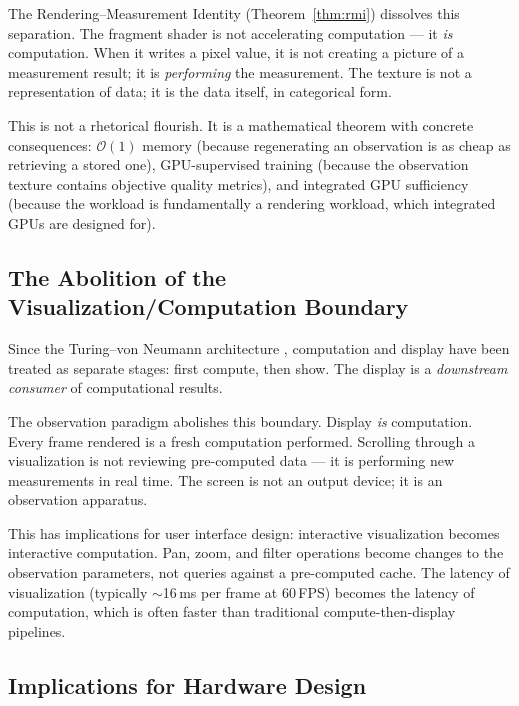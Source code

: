 \documentclass[11pt,twocolumn,a4paper]{article}
\newcommand{\BigO}{\mathcal{O}}
\begin{document}
The Rendering--Measurement Identity (Theorem~\ref{thm:rmi})
dissolves this separation. The fragment shader is not accelerating
computation --- it \emph{is} computation. When it writes a pixel
value, it is not creating a picture of a measurement result; it is
\emph{performing} the measurement. The texture is not a representation
of data; it is the data itself, in categorical form.

This is not a rhetorical flourish. It is a mathematical theorem with
concrete consequences: $\BigO(1)$ memory (because regenerating an
observation is as cheap as retrieving a stored one), GPU-supervised
training (because the observation texture contains objective quality
metrics), and integrated GPU sufficiency (because the workload is
fundamentally a rendering workload, which integrated GPUs are designed
for).

\subsection{The Abolition of the Visualization/Computation Boundary}

Since the Turing--von Neumann architecture \citep{turing1937,
vonneumann1945}, computation and display have been treated as
separate stages: first compute, then show. The display is a
\emph{downstream consumer} of computational results.

The observation paradigm abolishes this boundary. Display \emph{is}
computation. Every frame rendered is a fresh computation performed.
Scrolling through a visualization is not reviewing pre-computed data
--- it is performing new measurements in real time. The screen is not
an output device; it is an observation apparatus.

This has implications for user interface design: interactive
visualization becomes interactive computation. Pan, zoom, and filter
operations become changes to the observation parameters, not queries
against a pre-computed cache. The latency of visualization (typically
$\sim$16\,ms per frame at 60\,FPS) becomes the latency of
computation, which is often faster than traditional compute-then-display
pipelines.

\subsection{Implications for Hardware Design}
\end{document}
